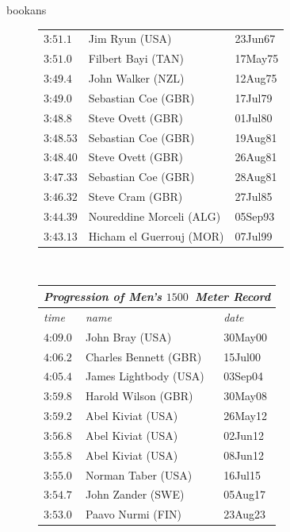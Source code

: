 \begin{exercises}
\begin{Filesave}{bookans}
\begin{figure}
{{\begin{tabular}[t]{|l|ll|}
           $\text{3:51}.1$      &Jim Ryun (USA)             &23Jun67 \\
           $\text{3:51}.0$      &Filbert Bayi (TAN)         &17May75 \\
           $\text{3:49}.4$      &John Walker (NZL)          &12Aug75 \\
           $\text{3:49}.0$      &Sebastian Coe (GBR)        &17Jul79 \\
           $\text{3:48}.8$      &Steve Ovett (GBR)          &01Jul80 \\
           $\text{3:48}.53$     &Sebastian Coe (GBR)        &19Aug81 \\
           $\text{3:48}.40$     &Steve Ovett (GBR)          &26Aug81 \\
           $\text{3:47}.33$     &Sebastian Coe (GBR)        &28Aug81 \\
           $\text{3:46}.32$     &Steve Cram (GBR)           &27Jul85 \\
           $\text{3:44}.39$     &Noureddine Morceli (ALG)   &05Sep93 \\
	   $\text{3:43}.13$     &Hicham el Guerrouj (MOR)   &07Jul99 \\
      \hline
      \end{tabular}
      \   %
        \begin{tabular}[t]{|l|ll|}
        \hline
          \multicolumn{3}{|c|}{\textit{Progression of Men's $1500$~Meter Record}}  \\
        \hline
        \textit{time}  &\textit{name}  &\textit{date}  \\
         \hline  
         $\text{4:09}.0$   &John Bray (USA)        &30May00  \\
         $\text{4:06}.2$   &Charles Bennett (GBR)  &15Jul00  \\
         $\text{4:05}.4$   &James Lightbody (USA)  &03Sep04  \\
         $\text{3:59}.8$   &Harold Wilson (GBR)    &30May08  \\
         $\text{3:59}.2$   &Abel Kiviat (USA)      &26May12  \\
         $\text{3:56}.8$   &Abel Kiviat (USA)      &02Jun12  \\
         $\text{3:55}.8$   &Abel Kiviat (USA)      &08Jun12  \\
         $\text{3:55}.0$   &Norman Taber (USA)     &16Jul15  \\
         $\text{3:54}.7$   &John Zander (SWE)      &05Aug17  \\
         $\text{3:53}.0$   &Paavo Nurmi (FIN)      &23Aug23  \\

\end{tabular}}}
\end{figure}
\end{Filesave}
\end{exercises}

